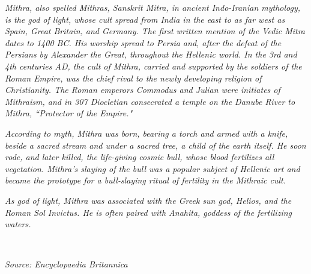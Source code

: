 \documentclass{report}
\begin{document}
{\large \noindent \textit{Mithra, also spelled Mithras, Sanskrit Mitra, in ancient Indo-Iranian mythology, is the god of light, whose cult spread from India in the east to as far west as Spain, Great Britain, and Germany. The first written mention of the Vedic Mitra dates to 1400 BC. His worship spread to Persia and, after the defeat of the Persians by Alexander the Great, throughout the Hellenic world. In the 3rd and 4th centuries AD, the cult of Mithra, carried and supported by the soldiers of the Roman Empire, was the chief rival to the newly developing religion of Christianity. The Roman emperors Commodus and Julian were initiates of Mithraism, and in 307 Diocletian consecrated a temple on the Danube River to Mithra, ``Protector of the Empire."}

\noindent \textit{According to myth, Mithra was born, bearing a torch and armed with a knife, beside a sacred stream and under a sacred tree, a child of the earth itself. He soon rode, and later killed, the life-giving cosmic bull, whose blood fertilizes all vegetation. Mithra's slaying of the bull was a popular subject of Hellenic art and became the prototype for a bull-slaying ritual of fertility in the Mithraic cult.}

\noindent \textit{As god of light, Mithra was associated with the Greek sun god, Helios, and the Roman Sol Invictus. He is often paired with Anahita, goddess of the fertilizing waters.}

\

\hspace{10cm} \textit{Source: Encyclopaedia Britannica}}

\newpage
\tableofcontents
\listoftables
\listoffigures







% 









\printindex



\end{document}

